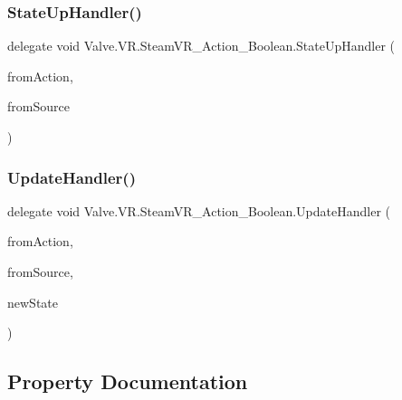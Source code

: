 \subsubsection{\texorpdfstring{StateUpHandler()}{StateUpHandler()}}
{\footnotesize\ttfamily delegate void Valve.\+V\+R.\+Steam\+V\+R\+\_\+\+Action\+\_\+\+Boolean.\+State\+Up\+Handler (\begin{DoxyParamCaption}\item[{\mbox{\hyperlink{class_valve_1_1_v_r_1_1_steam_v_r___action___boolean}{Steam\+V\+R\+\_\+\+Action\+\_\+\+Boolean}}}]{from\+Action,  }\item[{\mbox{\hyperlink{namespace_valve_1_1_v_r_a82e5bf501cc3aa155444ee3f0662853f}{Steam\+V\+R\+\_\+\+Input\+\_\+\+Sources}}}]{from\+Source }\end{DoxyParamCaption})}

\mbox{\label{class_valve_1_1_v_r_1_1_steam_v_r___action___boolean_ab9ee21a88a5d5d23603465c55796fcf5}} 
\subsubsection{\texorpdfstring{UpdateHandler()}{UpdateHandler()}}
{\footnotesize\ttfamily delegate void Valve.\+V\+R.\+Steam\+V\+R\+\_\+\+Action\+\_\+\+Boolean.\+Update\+Handler (\begin{DoxyParamCaption}\item[{\mbox{\hyperlink{class_valve_1_1_v_r_1_1_steam_v_r___action___boolean}{Steam\+V\+R\+\_\+\+Action\+\_\+\+Boolean}}}]{from\+Action,  }\item[{\mbox{\hyperlink{namespace_valve_1_1_v_r_a82e5bf501cc3aa155444ee3f0662853f}{Steam\+V\+R\+\_\+\+Input\+\_\+\+Sources}}}]{from\+Source,  }\item[{bool}]{new\+State }\end{DoxyParamCaption})}



\subsection{Property Documentation}
\mbox{\label{class_valve_1_1_v_r_1_1_steam_v_r___action___boolean_ae71b9db566f57de6f618fb3476ac4a5d}} 
